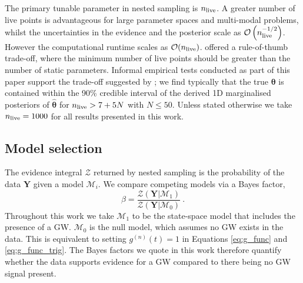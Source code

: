 \documentclass[fleqn,usenatbib,useAMS]{mnras}
\begin{document}
The primary tunable parameter in nested sampling is $n_{\rm live}$. A greater number of live points is advantageous for large parameter spaces and multi-modal problems, whilst the uncertainties in the evidence and the posterior scale as $\mathcal{O}\left(n_{\rm live}^{-1/2}\right)$. However the computational runtime scales as $\mathcal{O}(n_{\rm live})$. \cite{Ashton2022} offered a rule-of-thumb trade-off, where the minimum number of live points should be greater than the number of static parameters. Informal empirical tests conducted as part of this paper support the trade-off suggested by \cite{Ashton2022}; we find typically that the true ${\boldsymbol{\theta}}$ is contained within the 90\% credible interval of the derived 1D marginalised posteriors of ${\boldsymbol{\hat{\theta}}}$ for $n_{\rm live} > 7 + 5N$ with $N \leq 50$. Unless stated otherwise we take $n_{\rm live} = 1000$ for all results presented in this work. \newline 


\subsection{Model selection}\label{sec:model_selection}
The evidence integral $\mathcal{Z}$ returned by nested sampling is the probability of the data $\boldsymbol{Y}$ given a model $\mathcal{M}_i$. We compare competing models via a Bayes factor,
\begin{equation}
	\beta = \frac{\mathcal{Z}(\boldsymbol{Y} | \mathcal{M}_1)}{\mathcal{Z}(\boldsymbol{Y} | \mathcal{M}_0)} \ . \label{eq:bayes}
\end{equation}
Throughout this work we take $\mathcal{M}_1$ to be the state-space model that includes the presence of a GW. $\mathcal{M}_0$ is the null model, which assumes no GW exists in the data. This is equivalent to setting $g^{(n)}(t)=1$ in Equations \eqref{eq:g_func} and \eqref{eq:g_func_trig}. The Bayes factors we quote in this work therefore quantify whether the data supports evidence for a GW compared to there being no GW signal present.
\end{document}
